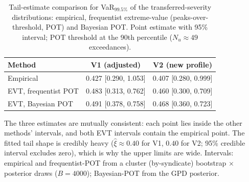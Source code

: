 \begin{table}[htbp]
\centering
\caption{Tail-estimate comparison for VaR$_{99.5\%}$ of the transferred-severity distributions: empirical, frequentist extreme-value (peaks-over-threshold, POT) and Bayesian POT. Point estimate with 95\% interval; POT threshold at the 90th percentile ($N_u\approx49$ exceedances).}
\label{tab:tail_comparison}
\begin{tabular}{lcc}
\toprule
\textbf{Method} & \textbf{V1 (adjusted)} & \textbf{V2 (new profile)} \\
\midrule
Empirical & 0.427 [0.290, 1.053] & 0.407 [0.280, 0.999] \\
EVT, frequentist POT & 0.483 [0.313, 0.762] & 0.460 [0.300, 0.709] \\
EVT, Bayesian POT & 0.491 [0.378, 0.758] & 0.468 [0.360, 0.723] \\
\bottomrule
\end{tabular}
\vspace{2pt}
{\footnotesize The three estimates are mutually consistent: each point lies inside the other methods' intervals, and both EVT intervals contain the empirical point. The fitted tail shape is credibly heavy ($\hat\xi\approx0.40$ for V1, $0.40$ for V2; 95\% credible interval excludes zero), which is why the upper limits are wide. Intervals: empirical and frequentist-POT from a cluster (by-syndicate) bootstrap $\times$ posterior draws ($B=4000$); Bayesian-POT from the GPD posterior.}
\end{table}
